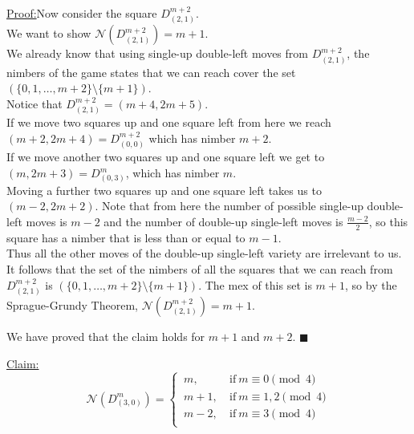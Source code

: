 \documentclass{article}
\newcommand{\T}[1]{\text{#1}}
\newcommand{\nim}{\mathcal{N}}
\newcommand{\D}[2]{D_{#1}^{#2}}
\newcommand{\SUDL}{single-up double-left}
\newcommand{\DUSL}{double-up single-left}
\newenvironment{claim}[1]{\par\noindent\underline{Claim:}\space#1}{}
\newenvironment{claimproof}[1]{\par\noindent\underline{Proof:}\space#1}
{\hfill $\blacksquare$}
\begin{document}
\begin{claimproof}
Now consider the square $\D{(2,1)}{m+2}$. \\
We want to show $\nim(\D{(2,1)}{m+2}) = m+1$. \\
We already know that using \SUDL{} moves from $\D{(2,1)}{m+2}$,
the nimbers of the game states that we can reach cover the set
$(\{0,1,\ldots,m+2\} \setminus \{m+1\})$. \\
Notice that $\D{(2,1)}{m+2} = (m+4,2m+5)$. \\
If we move two squares up and one square left from here we reach
$(m+2, 2m+4) = \D{(0,0)}{m+2}$ which has nimber $m+2$. \\
If we move another two squares up and one square left we get to
$(m, 2m+3) = \D{(0,3)}{m}$, which has nimber $m$. \\
Moving a further two squares up and one square left takes us to
$(m-2, 2m+2)$. Note that from here the number of possible
\SUDL{} moves is $m-2$ and the number of \DUSL{} moves is 
$\frac{m-2}{2}$, so this square has a nimber that is less 
than or equal to $m-1$. \\
Thus all the other moves of the \DUSL{} variety are irrelevant
to us. \\
It follows that the set of the nimbers of all the squares that we
can reach from $\D{(2,1)}{m+2}$ is
$(\{0,1,\ldots,m+2\} \setminus \{m+1\})$. The mex of this set is
$m+1$, so by the Sprague-Grundy Theorem,
$\nim(\D{(2,1)}{m+2}) = m+1$.
\medskip

We have proved that the claim holds for $m+1$ and $m+2$.
\end{claimproof}
\newpage

\begin{claim}
\begin{equation*}
  \nim(\D{(3,0)}{m}) =
  \begin{cases}
    \, m,  &\ \T{if}\ m \equiv 0   \pmod{4} \\
    \, m+1,&\ \T{if}\ m \equiv 1,2 \pmod{4} \\
    \, m-2,&\ \T{if}\ m \equiv 3   \pmod{4} \\
  \end{cases}
\end{equation*}
\end{claim}
\end{document}
